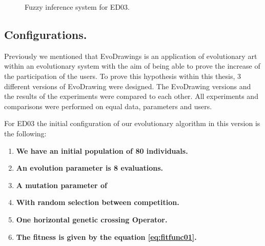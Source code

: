 \begin{figure}
\captionsetup{justification=centering,margin=2cm}
\centering
\setlength\fboxsep{0pt}
\setlength\fboxrule{0.7pt}
\caption{Fuzzy inference system for ED03.}
\label{fig:fis_02}
\end{figure}


\subsection{Configurations.}

Previously we mentioned that EvoDrawings is an application of evolutionary art
within an evolutionary system with the aim of being able to prove the increase
of the participation of the users. To prove this hypothesis within this thesis,
3 different versions of EvoDrawing were designed. The EvoDrawing versions and
the results of the experiments were compared to each other. All experiments and
comparisons were performed on equal data, parameters and users.

For ED03 the initial configuration of our evolutionary algorithm in this version
is the following:

\begin{enumerate}
	\item  \textbf{We have an initial population of 80 individuals.}

	\item  \textbf{An evolution parameter is 8 evaluations.}

	\item  \textbf{A mutation parameter of }
	\item  \textbf{With random selection between competition.}
	\item  \textbf{One horizontal genetic crossing Operator.}
	\item  \textbf{The fitness is given by the equation \ref{eq:fitfunc01}.}
\end{enumerate}

